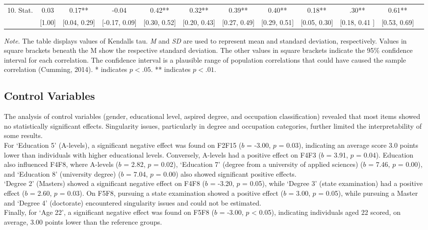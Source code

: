 \documentclass[
  12pt,
  a4paper,
  twoside]{article}
\begin{document}
\begin{table}[htbp]
{\begin{minipage}{\textheight}
\begin{tabular}{lccccccccccc}
10. Stat. & 0.03 & 0.17** & -0.04 & 0.42** & 0.32** & 0.39** & 0.40** & 0.18** & .30** & 0.61** \\
   & [1.00] & [0.04, 0.29] & [-0.17, 0.09] & [0.30, 0.52] & [0.20, 0.43] & [0.27, 0.49] & [0.29, 0.51] & [0.05, 0.30]& [0.18, 0.41 ] & [0.53, 0.69] \\
\hline
\end{tabular}
\par %
\small\textit{Note}. The table displays values of Kendalls tau. \textit{M} and \textit{SD} are used to represent mean and standard deviation, respectively. Values in square brackets beneath the M show the respective standard deviation. The other values in square brackets indicate the 95\% confidence interval for each correlation. The confidence interval is a plausible range of population correlations that could have caused the sample correlation (Cumming, 2014). * indicates $p < .05$. ** indicates $p < .01$.
\end{minipage}%
}
\end{table}

\subsection{Control Variables}\label{control-variables}

The analysis of control variables (gender, educational level, aspired degree, and occupation classification) revealed that most items showed no statistically significant effects. Singularity issues, particularly in degree and occupation categories, further limited the interpretability of some results.\\
For `Education 5' (A-levels), a significant negative effect was found on F2F15 (\(b\) = -3.00, \(p\) = 0.03), indicating an average score 3.0 points lower than individuals with higher educational levels. Conversely, A-levels had a positive effect on F4F3 (\(b\) = 3.91, \(p\) = 0.04). Education also influenced F4F8, where A-levels (\(b\) = 2.82, \(p\) = 0.02), `Education 7' (degree from a university of applied sciences) (\(b\) = 7.46, \(p\) = 0.00), and `Education 8' (university degree) (\(b\) = 7.04, \(p\) = 0.00) also showed significant positive effects.\\
`Degree 2' (Masters) showed a significant negative effect on F4F8 (\(b\) = -3.20, \(p\) = 0.05), while `Degree 3' (state examination) had a positive effect (\(b\) = 2.60, \(p\) = 0.03). On F5F8, pursuing a state examination showed a positive effect (\(b\) = 3.00, \(p\) = 0.05), while pursuing a Master and `Degree 4' (doctorate) encountered singularity issues and could not be estimated.\\
Finally, for `Age 22', a significant negative effect was found on F5F8 (\(b\) = -3.00, \(p\) \textless{} 0.05), indicating individuals aged 22 scored, on average, 3.00 points lower than the reference groups.
\end{document}
